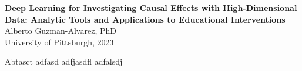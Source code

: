 \pagestyle{plain}

\begin{spacing}{2}
\begin{center}

\textbf{Deep Learning for Investigating Causal Effects with High-Dimensional Data: Analytic Tools and Applications to Educational Interventions}\\
        Alberto Guzman-Alvarez, PhD\\
        University of Pittsburgh, 2023\\
    \end{center}

Abtasct adfasd adfjasdfl adfalsdj 
    \end{spacing}        


\newpage